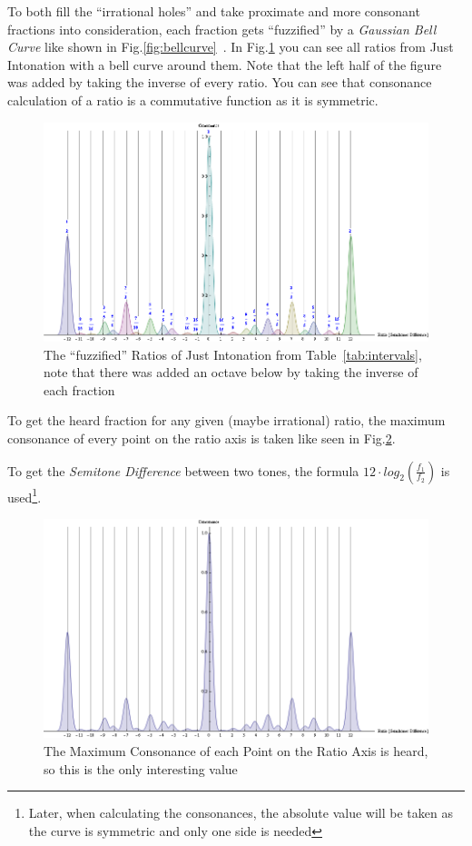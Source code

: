 \documentclass[12pt,a4paper,titlepage,oneside]{report}
\begin{document}
To both fill the ``irrational holes'' and take proximate and more consonant fractions into consideration, each fraction gets ``fuzzified'' by a \emph{Gaussian Bell Curve} like shown in Fig.\ref{fig:bellcurve}~\cite{bib:bell}. In Fig.\ref{fig:just_bell} you can see all ratios from Just Intonation with a bell curve around them. Note that the left half of the figure was added by taking the inverse of every ratio. You can see that consonance calculation of a ratio is a commutative function as it is symmetric.

\begin{figure}[!ht]
\includegraphics[width=\textwidth]{images/just_bell.png}
\centering
\caption{The ``fuzzified'' Ratios of Just Intonation from Table~\ref{tab:intervals}, note that there was added an octave below by taking the inverse of each fraction}
\label{fig:just_bell}
\end{figure}

To get the heard fraction for any given (maybe irrational) ratio, the maximum consonance of every point on the ratio axis is taken like seen in Fig.\ref{fig:just_bell_max}.

To get the \emph{Semitone Difference} between two tones, the formula $12 \cdot log_2(\frac{f_1}{f_2})$ is used\footnote{Later, when calculating the consonances, the absolute value will be taken as the curve is symmetric and only one side is needed}.

\begin{figure}[!ht]
\includegraphics[width=\textwidth]{images/just_bell_max.png}
\centering
\caption{The Maximum Consonance of each Point on the Ratio Axis is heard, so this is the only interesting value}
\label{fig:just_bell_max}
\end{figure}
\end{document}
